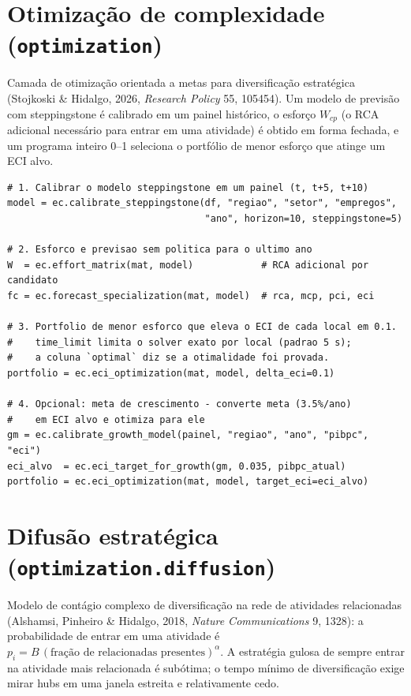 \documentclass[12pt, a4paper]{article}
\begin{document}
\section{Otimiza\c{c}\~{a}o de complexidade (\texttt{optimization})}

Camada de otimiza\c{c}\~{a}o orientada a metas para diversifica\c{c}\~{a}o
estrat\'{e}gica (Stojkoski \& Hidalgo, 2026, \emph{Research Policy} 55,
105454). Um modelo de previs\~{a}o com steppingstone \'{e} calibrado em um
painel hist\'{o}rico, o esfor\c{c}o $W_{cp}$ (o RCA adicional necess\'{a}rio
para entrar em uma atividade) \'{e} obtido em forma fechada, e um programa
inteiro 0--1 seleciona o portf\'{o}lio de menor esfor\c{c}o que atinge um
ECI alvo.

\begin{lstlisting}[caption={Fluxo da Otimiza\c{c}\~{a}o de ECI}]
# 1. Calibrar o modelo steppingstone em um painel (t, t+5, t+10)
model = ec.calibrate_steppingstone(df, "regiao", "setor", "empregos",
                                   "ano", horizon=10, steppingstone=5)

# 2. Esforco e previsao sem politica para o ultimo ano
W  = ec.effort_matrix(mat, model)            # RCA adicional por candidato
fc = ec.forecast_specialization(mat, model)  # rca, mcp, pci, eci

# 3. Portfolio de menor esforco que eleva o ECI de cada local em 0.1.
#    time_limit limita o solver exato por local (padrao 5 s);
#    a coluna `optimal` diz se a otimalidade foi provada.
portfolio = ec.eci_optimization(mat, model, delta_eci=0.1)

# 4. Opcional: meta de crescimento - converte meta (3.5%/ano)
#    em ECI alvo e otimiza para ele
gm = ec.calibrate_growth_model(painel, "regiao", "ano", "pibpc", "eci")
eci_alvo  = ec.eci_target_for_growth(gm, 0.035, pibpc_atual)
portfolio = ec.eci_optimization(mat, model, target_eci=eci_alvo)
\end{lstlisting}

\section{Difus\~{a}o estrat\'{e}gica (\texttt{optimization.diffusion})}

Modelo de cont\'{a}gio complexo de diversifica\c{c}\~{a}o na rede de
atividades relacionadas (Alshamsi, Pinheiro \& Hidalgo, 2018,
\emph{Nature Communications} 9, 1328): a probabilidade de entrar em uma
atividade \'{e} $p_i = B\,(\text{fra\c{c}\~{a}o de relacionadas
presentes})^{\alpha}$. A estrat\'{e}gia gulosa de sempre entrar na
atividade mais relacionada \'{e} sub\'{o}tima; o tempo m\'{i}nimo de
diversifica\c{c}\~{a}o exige mirar hubs em uma janela estreita e
relativamente cedo.
\end{document}

